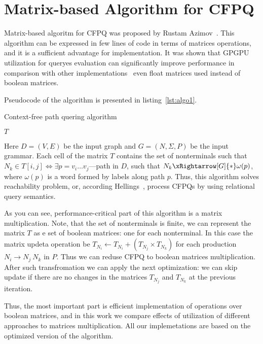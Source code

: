 \section{Matrix-based Algorithm for CFPQ}

Matrix-based algoritm for CFPQ was proposed by Rustam Azimov~\cite{Azimov:2018:CPQ:3210259.3210264}.
This algorithm can be expressed in few lines of code in terms of matrices operations, and it is a sufficient advantage for implementation.
It was shown that GPGPU utilization for queryes evaluation can significantly improve performance in comparison with other implementations~\cite{Azimov:2018:CPQ:3210259.3210264} even float matrices used instead of boolean matrices.

Pseudocode of the algorithm is presented in listing~\ref{lst:algo1}.

\begin{algorithm}
\begin{algorithmic}[1]
\caption{Context-free path quering algorithm}
\label{lst:algo1}
    
    \EndFor    
       
    \EndWhile
\State \Return $T$
\EndFunction
\end{algorithmic}
\end{algorithm}

Here $D = (V, E)$ be the input graph and $G = (N,\Sigma,P)$ be the input grammar. 
Each cell of the matrix $T$ contains the set of nonterminals such that $N_k \in T[i,j] \iff \exists p = v_i \ldots v_j $---path in $D$, such that $N_k \xRightarrow[G]{*} \omega(p) $, where $\omega(p)$ is a word formed by labels along path $p$.
Thus, this algorithm solves reachability problem, or, according Hellings~\cite{hellingsRelational}, process CFPQs by using relational query semantics.

As you can see, performance-critical part of this algorithm is a matrix multiplication.
Note, that the set of nonterminals is finite, we can represent the matrix $T$ as e set of boolean matrices: one for each nonterminal.
In this case the matrix updeta operation be $T_{N_i} \leftarrow T_{N_i} + (T_{N_j} \times T_{N_k})$ for each production $N_i \rightarrow N_j \ N_k$ in $P$.
Thus we can reduse CFPQ to boolean matrices multiplication. 
After such transfromation we can apply the next optimization: we can skip update if there are no changes in the matrices $T_{N_j}$ and $T_{N_k}$ at the previous iteration.

Thus, the most important part is efficient implementation of operations over boolean matrices, and in this work we compare effects of utilization of different approaches to matrices multiplication.
All our implemetations are based on the optimized version of the algorithm.
